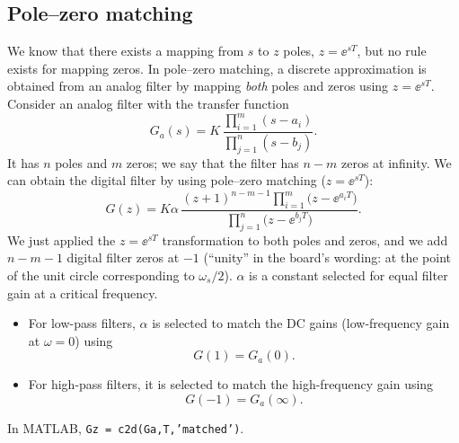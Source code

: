 \subsection{Pole--zero matching}
We know that there exists a mapping from $s$ to $z$ poles, $z=\ee^{sT}$, but no rule exists for mapping zeros.
In pole--zero matching, a discrete approximation is obtained from an analog filter by mapping \emph{both}
poles and zeros using $z=\ee^{sT}$. Consider an analog filter with the transfer function
\[
  G_a(s)=K\,\frac{\prod_{i=1}^{m}(s-a_i)}{\prod_{j=1}^{n}(s-b_j)}.
\]
It has $n$ poles and $m$ zeros; we say that the filter has $n-m$ zeros at infinity. We can obtain the digital
filter by using pole--zero matching ($z=\ee^{sT}$):
\begin{equation}\label{eq:pzm}
  G(z)=K\alpha\,\frac{(z+1)^{n-m-1}\prod_{i=1}^{m}\bigl(z-\ee^{a_iT}\bigr)}{\prod_{j=1}^{n}\bigl(z-\ee^{b_jT}\bigr)}.
\end{equation}
We just applied the $z=\ee^{sT}$ transformation to both poles and zeros, and we add $n-m-1$ digital filter
zeros at $-1$ (``unity'' in the board's wording: at the point of the unit circle corresponding to $\omega_s/2$).
$\alpha$ is a constant selected for equal filter gain at a critical frequency.
\begin{itemize}
  \item For low-pass filters, $\alpha$ is selected to match the DC gains (low-frequency gain at $\omega=0$) using
        \[G(1)=G_a(0).\]
  \item For high-pass filters, it is selected to match the high-frequency gain using
        \[G(-1)=G_a(\infty).\]
\end{itemize}
\begin{center}
\resizebox{0.35\linewidth}{!}{\figMatchPoints}
\end{center}
In MATLAB, \texttt{Gz = c2d(Ga,T,'matched')}.

